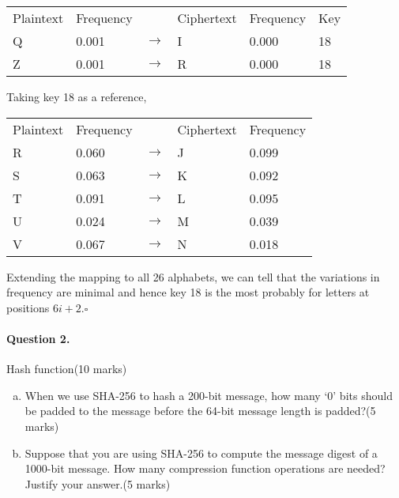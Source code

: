 \documentclass[12pt]{article}
\newcommand{\EOQ}{\hfill $\square$}
\begin{document}
\begin{enumerate}[(a)]
\begin{table}[H]
\centering
\begin{tabular}{llllll}
Plaintext & Frequency &   & Ciphertext & Frequency & Key \\
Q         & 0.001     & $\rightarrow$ & I          & 0.000     & 18  \\
Z         & 0.001     & $\rightarrow$ & R          & 0.000     & 18 
\end{tabular}
\end{table}
Taking key 18 as a reference,
\begin{table}[H]
\centering
\begin{tabular}{lllll}
Plaintext & Frequency &   & Ciphertext & Frequency \\
R         & 0.060     & $\rightarrow$ & J          & 0.099     \\
S         & 0.063     & $\rightarrow$ & K          & 0.092     \\
T         & 0.091     & $\rightarrow$ & L          & 0.095     \\
U         & 0.024     & $\rightarrow$ & M          & 0.039     \\
V         & 0.067     & $\rightarrow$ & N          & 0.018    
\end{tabular}
\end{table}
Extending the mapping to all 26 alphabets, we  can tell that the variations in frequency are minimal and hence key 18 is the most probably for letters at positions $6i+2$.\EOQ
\end{enumerate}
\paragraph{Question 2.}   Hash function\hfill (10 marks)
\begin{enumerate}[(a)]
\item When we use SHA-256 to hash a 200-bit message, how many `0' bits should be padded to the message before the 64-bit message length is padded?\hfill (5 marks)
\item Suppose that you are using SHA-256 to compute the message digest of a 1000-bit message. How many compression function operations are needed? Justify your answer.\hfill (5 marks)
\end{enumerate}
\end{document}

